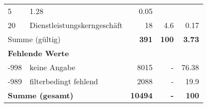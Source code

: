 \begin{longtable}{lXrrr}
       \num{5} &
       \num[round-mode=places,round-precision=2]{1.28} &
         \num[round-mode=places,round-precision=2]{0.05} \\

     20 &
     \multicolumn{1}{X}{ Dienstleistungskerngeschäft   } &


       \num{18} &
       \num[round-mode=places,round-precision=2]{4.6} &
         \num[round-mode=places,round-precision=2]{0.17} \\
     \midrule
     \multicolumn{2}{l}{Summe (gültig)} &
       \textbf{\num{391}} &
     \textbf{\num{100}} &
       \textbf{\num[round-mode=places,round-precision=2]{3.73}} \\
     \multicolumn{5}{l}{\textbf{Fehlende Werte}}\\
       -998 &
       keine Angabe &
         \num{8015} &
        - &
         \num[round-mode=places,round-precision=2]{76.38} \\
       -989 &
       filterbedingt fehlend &
         \num{2088} &
        - &
         \num[round-mode=places,round-precision=2]{19.9} \\
     \midrule
     \multicolumn{2}{l}{\textbf{Summe (gesamt)}} &
          \textbf{\num{10494}} &
        \textbf{-} &
        \textbf{\num{100}} \\
     \bottomrule
     \end{longtable}
     

